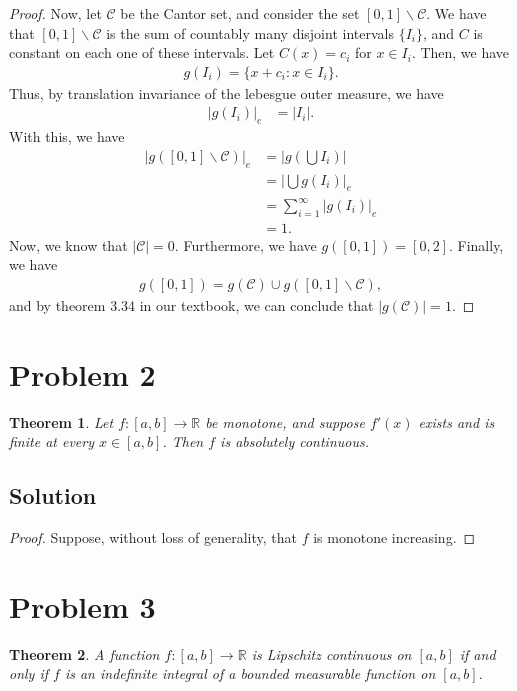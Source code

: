 \documentclass[10pt,a4paper]{article}
\theoremstyle{theorem}
\newtheorem{theorem}{Theorem}
\theoremstyle{definition}
\begin{document}
\begin{proof}
Now, let $\mathcal{C}$ be the Cantor set, and consider the set $[0, 1]\backslash \mathcal{C}$. We have that $[0, 1]\backslash \mathcal{C}$ is the sum of countably many disjoint intervals $\{I_i\}$, and $C$ is constant on each one of these intervals. Let $C(x) = c_i$ for $x \in I_i$. Then, we have
\begin{align*}
g(I_i) = \{x + c_i: x \in I_i \}.
\end{align*}
Thus, by translation invariance of the lebesgue outer measure, we have
\begin{align*}
|g(I_i)|_e &= |I_i|.
\end{align*}
With this, we have
\begin{align*}
|g([0, 1]\backslash \mathcal{C})|_e &= \left| g \left(\bigcup I_i \right) \right|\\
&= \left| \bigcup g(I_i) \right|_e\\
&= \sum_{i=1}^\infty |g(I_i)|_e\\
&= 1.
\end{align*}
Now, we know that $|\mathcal{C}| = 0$. Furthermore, we have $g([0, 1]) = [0, 2]$. Finally, we have
\begin{align*}
g([0, 1]) = g(\mathcal{C}) \cup g([0, 1]\backslash \mathcal{C}),
\end{align*}
and by theorem 3.34 in our textbook, we can conclude that $|g(\mathcal{C})| = 1$.
\end{proof}

\section*{Problem 2}
\begin{theorem}
Let $f:[a, b] \to \mathbb{R}$ be monotone, and suppose $f'(x)$ exists and is finite at every $x \in [a, b]$. Then $f$ is absolutely continuous. 
\end{theorem}

\subsection*{Solution}
\begin{proof}
Suppose, without loss of generality, that $f$ is monotone increasing.
\end{proof}

\section*{Problem 3}
\begin{theorem}
A function $f:[a, b] \to \mathbb{R}$ is Lipschitz continuous on $[a, b]$ if and only if $f$ is an indefinite integral of a bounded measurable function on $[a, b]$.
\end{theorem}
\end{document}
